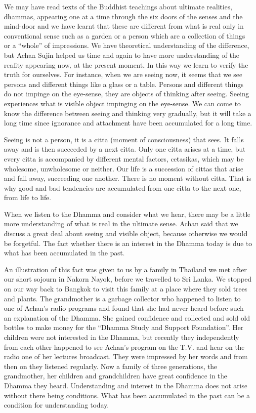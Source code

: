 We may have read texts of the Buddhist teachings about ultimate realities, dhammas, 
appearing one at a time through the six doors of the senses and the mind-door and we 
have learnt that these are different from what is real only in conventional sense such 
as a garden or a person which are a collection of things or a ``whole'' of impressions. 
We have theoretical understanding of the difference, but Achan Sujin helped us time 
and again to have more understanding of the reality appearing now, at the present 
moment. In this way we learn to verify the truth for ourselves. For instance, when we 
are seeing now, it seems that we see persons and different things like a glass or a table. Persons and different things do not impinge on the eye-sense, they are objects of 
thinking after seeing. Seeing experiences what is visible object impinging on the eye-sense. We can come to know the difference between seeing and thinking very gradually, but it will take a long time since ignorance and attachment have been accumulated for a long time. 

Seeing is not a person, it is a citta (moment of consciousness) that sees. It falls away 
and is then succeeded by a next citta. Only one citta arises at a time, but every citta is 
accompanied by different mental factors, cetasikas, which may be wholesome, unwholesome or neither. Our life is a succession of cittas that arise and fall away, succeeding one another. There is no moment without citta. That is why good and bad 
tendencies are accumulated from one citta to the next one, from life to life. 

When we listen to the Dhamma and consider what we hear, there may be a little more 
understanding of what is real in the ultimate sense. Achan said that we discuss a 
great deal about seeing and visible object, because otherwise we would be forgetful. 
The fact whether there is an interest in the Dhamma today is due to what has been accumulated in the past. 

An illustration of this fact was given to us by a family in Thailand we met after our 
short sojourn in Nakorn Nayok, before we travelled to Sri Lanka. We stopped on our 
way back to Bangkok to visit this family at a place where they sold trees and plants. 
The grandmother is a garbage collector who happened to listen to one of Achan’s radio programs and found that she had never heard before such an explanation of the 
Dhamma. She gained confidence and collected and sold old bottles to make money 
for the ``Dhamma Study and Support Foundation''. Her children were not interested 
in the Dhamma, but recently they independently from each other happened to see 
Achan’s program on the T.V. and hear on the radio one of her lectures broadcast. 
They were impressed by her words and from then on they listened regularly. Now a 
family of three generations, the grandmother, her children and grandchildren have 
great confidence in the Dhamma they heard.  Understanding and interest in the Dhamma does not arise without there being conditions. What has been 
accumulated in the past can be a condition for understanding today. 

